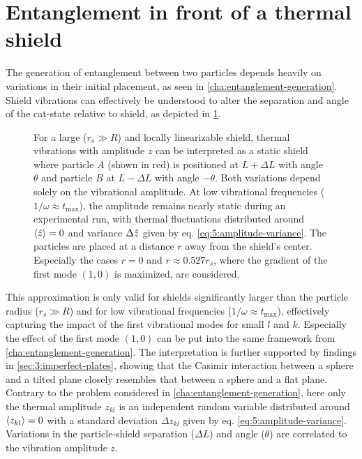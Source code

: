 \section{Entanglement in front of a thermal shield}\label{sec:5:thermal-entanglement}
The generation of entanglement between two particles depends heavily on variations in their initial placement, as seen in \cref{cha:entanglement-generation}.
Shield vibrations can effectively be understood to alter the separation and angle of the cat-state relative to shield, as depicted in \cref{fig:5:vibrating-translation-to-variations}.
\begin{figure}[!htbp]
  \centering
  \def\svgwidth{\textwidth}
  
  \caption{For a large ($r_s \gg R$) and locally linearizable shield, thermal vibrations with amplitude $z$ can be interpreted as a static shield where particle $A$ (shown in red) is positioned at $L+\Delta L$ with angle $\theta$ and particle $B$ at $L-\Delta L$ with angle $-\theta$. Both variations depend solely on the vibrational amplitude. At low vibrational frequencies ($1/\omega \approx t_\mathrm{max}$), the amplitude remains nearly static during an experimental run, with thermal fluctuations distributed around $\left\langle\hat{z}\right\rangle=0$ and variance $\Delta \hat{z}$ given by eq. \eqref{eq:5:amplitude-variance}. The particles are placed at a distance $r$ away from the shield's center. Especially the cases $r=0$ and $r\approx 0.527r_s$, where the gradient of the first mode $(1,0)$ is maximized, are considered.}
  \label{fig:5:vibrating-translation-to-variations}
\end{figure}
This approximation is only valid for shields significantly larger than the particle radius ($r_s \gg R$) and for low vibrational frequencies ($1/\omega \approx t_\mathrm{max}$), effectively capturing the impact of the first vibrational modes for small $l$ and $k$.
Especially the effect of the first mode $(1,0)$ can be put into the same framework from \cref{cha:entanglement-generation}. 
The interpretation is further supported by findings in \cref{sec:3:imperfect-plates}, showing that the Casimir interaction between a sphere and a tilted plane closely resembles that between a sphere and a flat plane.
Contrary to the problem considered in \cref{cha:entanglement-generation}, here only the thermal amplitude $z_{kl}$ is an independent random variable distributed around $\left\langle z_{kl}\right\rangle=0$ with a standard deviation $\Delta z_{kl}$ given by eq. \eqref{eq:5:amplitude-variance}. 
Variations in the particle-shield separation ($\Delta L$) and angle ($\theta$) are correlated to the vibration amplitude $z$.
